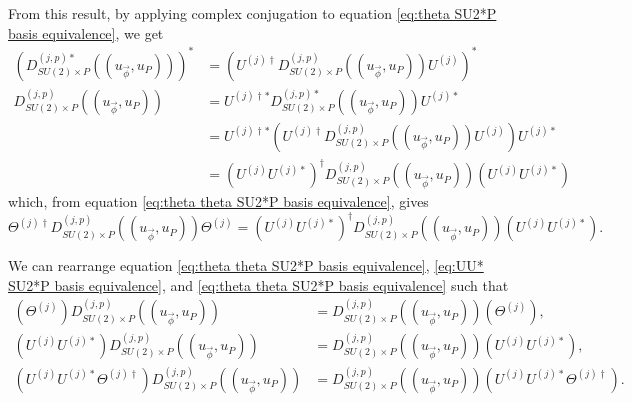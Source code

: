 \documentclass[preprint, 12pt]{revtex4-2}
\numberwithin{equation}{section}
\begin{document}
From this result, by applying complex conjugation to equation \ref{eq:theta SU2*P basis equivalence}, we get
\begin{equation}\label{eq:UU* SU2*P basis equivalence}
    \begin{aligned}
        \left(D_{SU(2)\times P}^{(j,p)\ast}((u_{\vec{\phi}}, u_P))\right)^\ast &= \left(U^{(j)\dagger} D_{SU(2)\times P}^{(j,p)}((u_{\vec{\phi}}, u_P))U^{(j)}\right)^\ast\\
        D_{SU(2)\times P}^{(j,p)}((u_{\vec{\phi}}, u_P)) &= U^{(j)\dagger\ast} D_{SU(2)\times P}^{(j,p)\ast}((u_{\vec{\phi}}, u_P))U^{(j)\ast} \\
        &= U^{(j)\dagger\ast} \left(U^{(j)\dagger} D_{SU(2)\times P}^{(j,p)}((u_{\vec{\phi}}, u_P))U^{(j)}\right)U^{(j)\ast} \\
        &= \left(U^{(j)}U^{(j)\ast}\right)^\dagger D_{SU(2)\times P}^{(j,p)}((u_{\vec{\phi}}, u_P))\left(U^{(j)}U^{(j)\ast}\right)
    \end{aligned}
\end{equation}
which, from equation \ref{eq:theta theta SU2*P basis equivalence}, gives
\begin{equation}\label{eq:equate basis equivalence}
    \Theta^{(j)\dagger} D_{SU(2)\times P}^{(j,p)}((u_{\vec{\phi}}, u_P))\Theta^{(j)} = \left(U^{(j)}U^{(j)\ast}\right)^\dagger D_{SU(2)\times P}^{(j,p)}((u_{\vec{\phi}}, u_P))\left(U^{(j)}U^{(j)\ast}\right).
\end{equation}

We can rearrange equation \ref{eq:theta theta SU2*P basis equivalence}, \ref{eq:UU* SU2*P basis equivalence}, and \ref{eq:theta theta SU2*P basis equivalence} such that
\begin{equation}
    \begin{aligned}
        \left(\Theta^{(j)}\right) D_{SU(2)\times P}^{(j,p)}((u_{\vec{\phi}}, u_P)) &= D_{SU(2)\times P}^{(j,p)}((u_{\vec{\phi}}, u_P))\left(\Theta^{(j)}\right), \\
        \left(U^{(j)}U^{(j)\ast}\right)D_{SU(2)\times P}^{(j,p)}((u_{\vec{\phi}}, u_P)) &= D_{SU(2)\times P}^{(j,p)}((u_{\vec{\phi}}, u_P))\left(U^{(j)}U^{(j)\ast}\right), \\
        \left(U^{(j)}U^{(j)\ast}\Theta^{(j)\dagger}\right) D_{SU(2)\times P}^{(j,p)}((u_{\vec{\phi}}, u_P)) &= D_{SU(2)\times P}^{(j,p)}((u_{\vec{\phi}}, u_P))\left(U^{(j)}U^{(j)\ast}\Theta^{(j)\dagger}\right).
    \end{aligned}
\end{equation}
\end{document}
